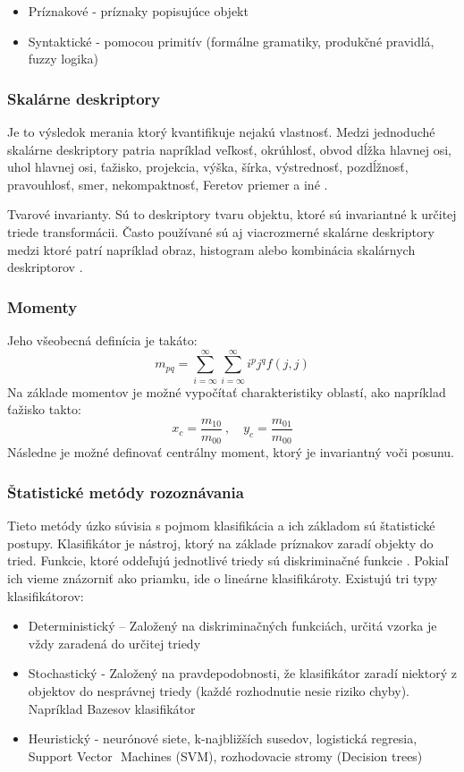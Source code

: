 \begin{itemize}
\item Príznakové - príznaky popisujúce objekt 
\item Syntaktické - pomocou primitív (formálne gramatiky, produkčné pravidlá, fuzzy logika)
\end{itemize}

\subsubsection{Skalárne deskriptory}
Je to výsledok merania ktorý kvantifikuje nejakú vlastnosť. Medzi jednoduché skalárne deskriptory  patria napríklad veľkosť,  okrúhlosť, obvod dĺžka hlavnej osi, uhol hlavnej osi, ťažisko,  projekcia, výška, šírka, výstrednosť, pozdĺžnosť, pravouhlosť, smer, nekompaktnosť, Feretov priemer a iné \cite{Analysis_and_Machine_Vision}. 

Tvarové invarianty. Sú to deskriptory tvaru objektu, ktoré sú invariantné k určitej triede transformácii.
Často používané sú aj viacrozmerné skalárne deskriptory medzi ktoré patrí napríklad obraz, histogram alebo kombinácia skalárnych deskriptorov  \cite{Analysis_and_Machine_Vision}. 

\subsubsection{Momenty}

Jeho všeobecná definícia je takáto:
$$m_{pq}=\sum_{i=\infty}^\infty \sum_{i=\infty}^\infty i^p j^q f(j,j)$$
Na základe momentov je možné vypočítať charakteristiky oblastí, ako napríklad ťažisko takto: 
$$x_c=\frac{m_{10}}{m_{00}}\ {,}\quad y_c=\frac{m_{01}}{m_{00}}$$
Následne je možné definovať centrálny moment, ktorý je invariantný voči posunu. 


\subsubsection{Štatistické metódy rozoznávania}
Tieto metódy úzko súvisia s pojmom klasifikácia a ich základom sú štatistické postupy. Klasifikátor je nástroj, ktorý na základe príznakov zaradí objekty do tried. Funkcie, ktoré oddeľujú jednotlivé triedy sú diskriminačné funkcie \cite{pocitacove_videnie_v_praxi}. Pokiaľ ich vieme znázorniť ako priamku, ide o lineárne klasifikároty. Existujú tri typy klasifikátorov: 

\begin{itemize}
\item Deterministický  – Založený na diskriminačných funkciách, určitá vzorka je vždy zaradená do určitej triedy 
\item Stochastický -  Založený na pravdepodobnosti, že klasifikátor zaradí niektorý z objektov do nesprávnej triedy (každé rozhodnutie nesie riziko chyby).  Napríklad Bazesov klasifikátor
\item Heuristický - neurónové siete, k-najbližších susedov, logistická regresia, Support Vector  Machines (SVM), rozhodovacie stromy (Decision trees) 
\end{itemize}

